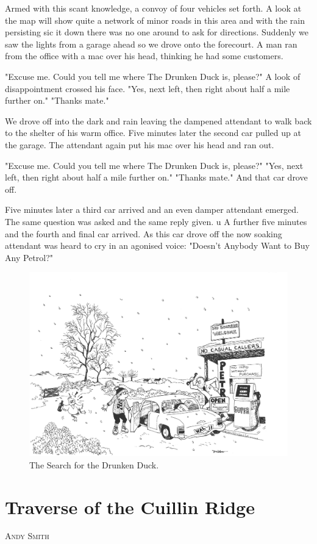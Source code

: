 \documentclass[a5paper,openany,font 10pt]{scrbook}
\makeatletter
\newcommand{\chapterauthor}[1]{%
{\parindent0pt\vspace*{-5pt}%
\linespread{1.1}\large\scshape#1%
\par\nobreak\vspace*{35pt}}
\@afterheading%
}
\makeatother
\begin{document}
Armed with this scant knowledge, a convoy of four vehicles
set forth. A look at the map will show quite a network of minor
roads in this area and with the rain persisting  sic  it down
there was no one around to ask for directions. Suddenly we saw
the lights from a garage ahead so we drove onto the forecourt. A
man ran from the office with a mac over his head, thinking he had
some customers.

"Excuse me. Could you tell me where The Drunken Duck is,
please?"
A look of disappointment crossed his face.
"Yes, next left, then right about half a mile further on."
"Thanks mate."

We drove off into the dark and rain leaving the dampened
attendant to walk back to the shelter of his warm office.
Five minutes later the second car pulled up at the garage.
The attendant again put his mac over his head and ran out.

"Excuse me. Could you tell me where The Drunken Duck is,
please?"
"Yes, next left, then right about half a mile further on."
"Thanks mate."
And that car drove off.

Five minutes later a third car arrived and an even damper
attendant emerged. The same question was asked and the same reply
given. u  A further five minutes and the fourth and final car arrived.
As this car drove off the now soaking attendant was heard to
cry in an agonised voice:
"Doesn't  Anybody  Want to Buy Any Petrol?"
\begin{figure}[htb]
\centering
\includegraphics[width=.9\linewidth]{./images/Cartoon_04.jpg}
\caption{\label{fig:org4734f64}
The Search for the Drunken Duck.}
\end{figure}

\chapter{Traverse of the Cuillin Ridge}
\label{sec:org9a3d94f}
\chapterauthor{Andy Smith}
\end{document}
